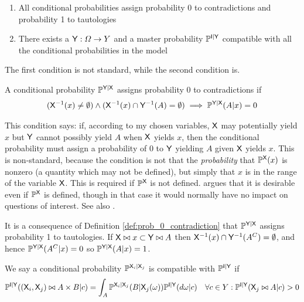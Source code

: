 \begin{enumerate}
	\item All conditional probabilities assign probability 0 to contradictions and probability 1 to tautologies
	\item There exists a $\mathsf{Y}:\Omega\to Y$ and a master probability $\mathbb{P}^{\mathsf{I}|\mathsf{Y}}$ compatible with all the conditional probabilities in the model
\end{enumerate}

The first condition is not standard, while the second condition is.

\begin{definition}\label{def:prob_0_contradiction}
A conditional probability $\mathbb{P}^{\mathsf{Y}|\mathsf{X}}$ assigns probability 0 to contradictions if 
\begin{align}
	(\mathsf{X}^{-1}(x)\neq \emptyset)\land (\mathsf{X}^{-1}(x)\cap \mathsf{Y}^{-1}(A) = \emptyset) \implies\mathbb{P}^{\mathsf{Y}|\mathsf{X}}(A|x) = 0
\end{align}
\end{definition}

This condition says: if, according to my chosen variables, $\mathsf{X}$ may potentially yield $x$ but $\mathsf{Y}$ cannot possibly yield $A$ when $\mathsf{X}$ yields $x$, then the conditional probability must assign a probability of 0 to $\mathsf{Y}$ yielding $A$ given $\mathsf{X}$ yields $x$. This is non-standard, because the condition is not that the \emph{probability} that $\mathbb{P}^{\mathsf{X}}(x)$ is nonzero (a quantity which may not be defined), but simply that $x$ is in the range of the variable $\mathsf{X}$. This is required if $\mathbb{P}^{\mathsf{X}}$ is not defined. \citet{hajek_what_2003} argues that it is desirable even if $\mathbb{P}^{\mathsf{X}}$ is defined, though in that case it would normally have no impact on questions of interest. See also \citet{renyi_conditional_1956}.

It is a consequence of Definition \ref{def:prob_0_contradiction} that $\mathbb{P}^{\mathsf{Y}|\mathsf{X}}$ assigns probability 1 to tautologies. If $\mathsf{X}\bowtie x\subset \mathsf{Y}\bowtie A$ then $\mathsf{X}^{-1}(x)\cap \mathsf{Y}^{-1}(A^C) = \emptyset$, and hence $\mathbb{P}^{\mathsf{Y}|\mathsf{X}}(A^C|x) = 0$ so $\mathbb{P}^{\mathsf{Y}|\mathsf{X}}(A|x) = 1$.

\begin{definition}\label{def:compat_master}
We say a conditional probability $\mathbb{P}^{\mathsf{X}_i|\mathsf{X}_j}$ is compatible with $\mathbb{P}^{\mathsf{I}|\mathsf{Y}}$ if
\begin{align}
	\mathbb{P}^{\mathsf{I}|\mathsf{Y}}((\mathsf{X}_i,\mathsf{X}_j)\bowtie A\times B|c) &= \int_A \mathbb{P}^{\mathsf{X}_{i}|\mathsf{X}_j}(B|\mathsf{X}_j(\omega))\mathbb{P}^{\mathsf{I}|\mathsf{Y}}(d\omega|c) &\forall c\in Y:\mathbb{P}^{\mathsf{I}|\mathsf{Y}}(\mathsf{X}_j\bowtie A|c)>0 \label{eq:ssc_2}
\end{align}
\end{definition}

